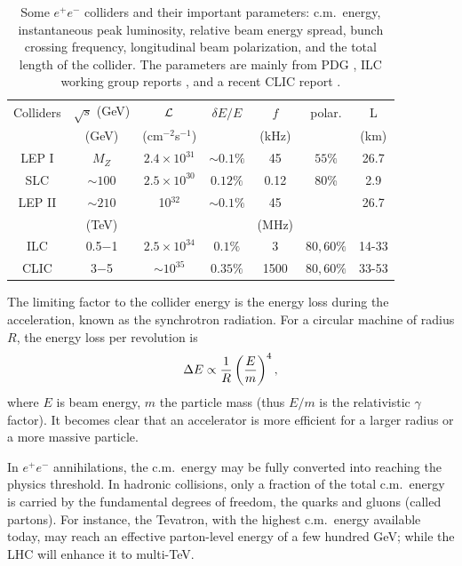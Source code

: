 \documentclass[12pt,prd,aps,floats,preprintnumbers,preprint,superscriptaddress,floatfix,nofootinbib]{revtex4}
\def\epem{e^+e^-}
\def\bea{\begin{eqnarray}}
\def\eea{\end{eqnarray}}
\begin{document}
\begin{table}[tb]
    \begin{tabular}[t]{|c| c | c | c |c|c|c|}
       \hline
        Colliders  & $\sqrt s$ (GeV) & ${\cal{L}}$ & $\delta E/E$ & $f$& 
        polar. & L \\
 &(GeV) & (cm$^{-2}$s$^{-1}$)& & (kHz) & &(km) \\
        \hline        \hline
        LEP I   & $M_Z$ & $2.4\times10^{31}$  &  $\sim 0.1\%$   &  45   & $55\%$ & 26.7\\
        SLC    & $ \sim 100 $             & $2.5\times 10^{30}$  &  $0.12\%$ & 0.12 &  80\% & 2.9\\
        LEP II  & $\sim 210$ &  10$^{32}$   & $\sim 0.1\%$ & 45 & & 26.7 \\
\hline\hline
 &(TeV) & & & (MHz) & & \\
        ILC    & 0.5$-$1  & $2.5\times 10^{34}$ & $0.1\%$ &  3 & $80,60\%$ & 14-33\\
\hline
                CLIC    & 3$-$5  & $\sim 10^{35}$ & $0.35\%$ & 1500 & $80,60\%$ & 33-53\\
\hline
    \end{tabular}
\caption{Some $e^+e^-$ colliders and their important parameters:
c.m.~energy, instantaneous peak luminosity, relative beam energy spread, 
bunch crossing frequency, longitudinal beam 
polarization, and the total length of the collider. The parameters are mainly from
PDG {\protect \cite{PDG}}, 
ILC working group reports {\protect \cite{ILC}}, 
 and a recent CLIC report  {\protect \cite{CLIC}}.
}
\label{eecolliders} 
\end{table}

The limiting factor to the collider energy is the energy loss 
during the acceleration, known as the synchrotron radiation.
For a circular machine of radius $R$, the energy loss per revolution
is \cite{PDG,book-exp}
\bea
\label{synch}
\Delta E \propto {1\over R} \left({E\over m}\right)^4,
\eea
where $E$ is beam energy, $m$ the particle mass (thus $E/m$ is the
relativistic $\gamma$ factor). It becomes clear that an accelerator is more
efficient for a larger radius or a more massive particle.

In $\epem$ annihilations, the c.m.~energy may be fully converted into reaching the 
physics threshold. In hadronic collisions, only a fraction of the total c.m.~energy
is carried by the fundamental degrees of freedom, the quarks and gluons (called partons).
For instance, the Tevatron, with the highest c.m.~energy
available today, may reach an effective parton-level energy of a few hundred GeV;
while the LHC will enhance it to multi-TeV.
\end{document}
